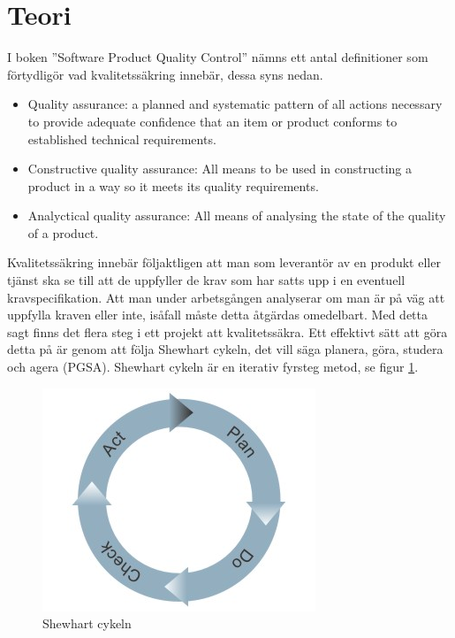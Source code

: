 \section{Teori}
I boken ''Software Product Quality Control'' \cite{SPQC} nämns ett antal definitioner som förtydligör vad kvalitetssäkring innebär, dessa syns nedan.  

\begin{itemize}
  \item Quality assurance: a planned and systematic pattern of all actions necessary to provide adequate confidence that an item or product conforms to established technical requirements. 
  \item Constructive quality assurance: All means to be used in constructing a product in a way so it  meets its quality requirements. 
  \item Analyctical quality assurance: All means of analysing the state of the quality of a product. 
\end{itemize}
\noindent Kvalitetssäkring innebär följaktligen att man som leverantör av en produkt eller tjänst ska se till att de uppfyller de krav som har satts upp i en eventuell kravspecifikation. Att man under arbetsgången analyserar om man är på väg att uppfylla kraven eller inte, isåfall måste detta åtgärdas omedelbart.
\newline
\newline
Med detta sagt finns det flera steg i ett projekt att kvalitetssäkra. Ett effektivt sätt att göra detta på är genom att följa Shewhart cykeln, det vill säga planera, göra, studera och agera (PGSA). Shewhart cykeln är en iterativ fyrsteg metod, se figur \ref{fig:shewcycle}.
\newline

\begin{figure}[h]
\centerline{\includegraphics[scale=0.5]{ruben-tex/graphic/shewhartcycle}}
\caption{Shewhart cykeln}
\label{fig:shewcycle}
\end{figure}

